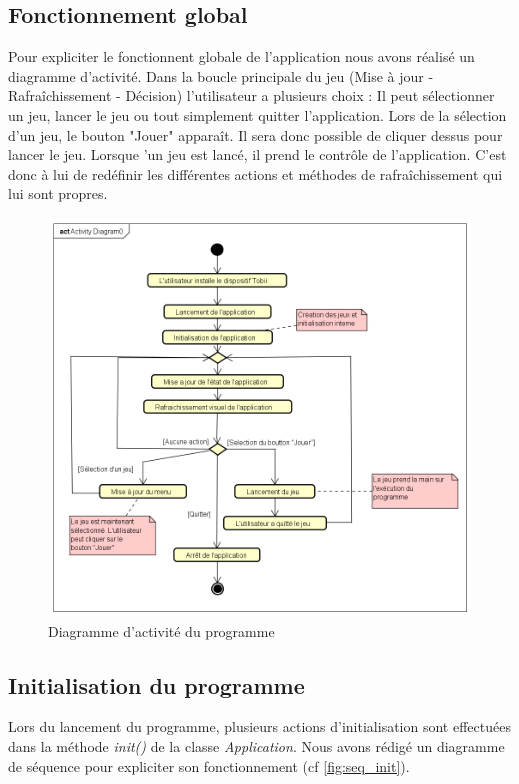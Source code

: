 \documentclass{polytech/polytech}
\begin{document}
\subsection{Fonctionnement global}
Pour expliciter le fonctionnent globale de l'application nous avons réalisé un diagramme d'activité. Dans la boucle principale du jeu (Mise à jour - Rafraîchissement - Décision) l'utilisateur a plusieurs choix : Il peut sélectionner un jeu, lancer le jeu ou tout simplement quitter l'application.
Lors de la sélection d'un jeu, le bouton "Jouer" apparaît. Il sera donc possible de cliquer dessus pour lancer le jeu. Lorsque 'un jeu est lancé, il prend le contrôle de l'application. C'est donc à lui de redéfinir les différentes actions et méthodes de rafraîchissement qui lui sont propres.
\begin{figure}
    \centering
    \includegraphics[width=15cm]{img/diagrammes/ActivityFoncPrincipal.png}
    \caption{Diagramme d'activité du programme}
    \label{fig:activityDiag}
\end{figure}
\subsection{Initialisation du programme}
\label{sec:fonc_init}
Lors du lancement du programme, plusieurs actions d'initialisation sont effectuées dans la méthode \textit{init()} de la classe \textit{Application}. Nous avons rédigé un diagramme de séquence pour expliciter son fonctionnement (cf \autoref{fig:seq_init}). 
\end{document}
